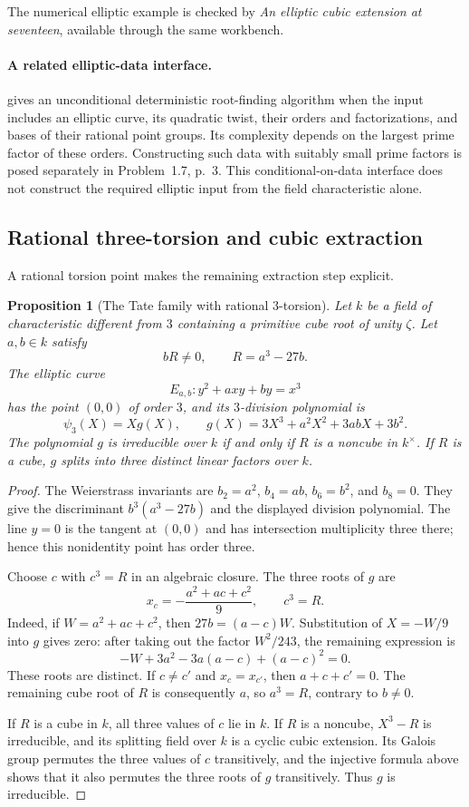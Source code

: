 \documentclass[11pt]{article}
\newtheorem{proposition}[theorem]{Proposition}
\theoremstyle{definition}
\theoremstyle{remark}
\begin{document}
The numerical elliptic example is checked by \emph{An elliptic cubic extension at seventeen}, available through the same workbench.

\paragraph{A related elliptic-data interface.}
\citet[Definition~1.2 and Theorem~1.3, p.~2]{Spaenlehauer2026}
gives an unconditional deterministic root-finding algorithm when the input includes an elliptic curve, its quadratic twist, their orders and factorizations, and bases of their rational point groups. Its complexity depends on the largest prime factor of these orders. Constructing such data with suitably small prime factors is posed separately in Problem~1.7, p.~3. This conditional-on-data interface does not construct the required elliptic input from the field characteristic alone.

\subsection{Rational three-torsion and cubic extraction}
A rational torsion point makes the remaining extraction step explicit.


\begin{proposition}[The Tate family with rational $3$-torsion]
\label{prop:tate-cubic-gate}
Let $k$ be a field of characteristic different from $3$ containing
a primitive cube root of unity $\zeta$.  Let $a,b\in k$ satisfy
\[
 bR\ne0,\qquad R=a^3-27b.
\]
The elliptic curve
\[
 E_{a,b}: y^2+axy+by=x^3
\]
has the point $(0,0)$ of order $3$, and its $3$-division polynomial is
\[
 \psi_3(X)=Xg(X),\qquad
 g(X)=3X^3+a^2X^2+3abX+3b^2.
\]
The polynomial $g$ is irreducible over $k$ if and only if $R$ is
a noncube in $k^\times$.  If $R$ is a cube, $g$ splits into three
distinct linear factors over $k$.
\end{proposition}

\begin{proof}
The Weierstrass invariants are
$b_2=a^2$, $b_4=ab$, $b_6=b^2$, and $b_8=0$.
They give the discriminant $b^3(a^3-27b)$ and the displayed
division polynomial.  The line $y=0$ is the tangent at $(0,0)$
and has intersection multiplicity three there; hence this
nonidentity point has order three.

Choose $c$ with $c^3=R$ in an algebraic closure.  The three roots
of $g$ are
\[
 x_c=-\frac{a^2+ac+c^2}{9},
 \qquad c^3=R.
\]
Indeed, if $W=a^2+ac+c^2$, then
$27b=(a-c)W$.  Substitution of $X=-W/9$ into $g$ gives zero:
after taking out the factor $W^2/243$, the remaining expression is
\[
 -W+3a^2-3a(a-c)+(a-c)^2=0.
\]
These roots are distinct.  If $c\ne c'$ and $x_c=x_{c'}$, then
$a+c+c'=0$.  The remaining cube root of $R$ is consequently $a$,
so $a^3=R$, contrary to $b\ne0$.

If $R$ is a cube in $k$, all three values of $c$ lie in $k$.
If $R$ is a noncube, $X^3-R$ is irreducible, and its splitting
field over $k$ is a cyclic cubic extension.  Its Galois group
permutes the three values of $c$ transitively, and the injective
formula above shows that it also permutes the three roots of
$g$ transitively.  Thus $g$ is irreducible.
\end{proof}
\end{document}
